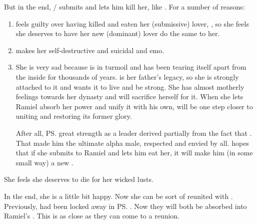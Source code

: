 But in the end, \Shiaraid/\Belzir{} submits and lets him kill her, like . 
For a number of reasons:
\begin{enumerate}
  \item 
    \Shiaraid{} feels guilty over having killed and eaten her (submissive) lover, \Eryal, so she feels she deserves to have her new (dominant) lover do the same to her. 
  \item 
    \NexagglachelsCurse{} makes her self-destructive and suicidal and emo. 
  \item 
    She is very sad because \Mystraacht{} is in turmoil and has been tearing itself apart from the inside for thousands of years. 
    \Mystraacht{} is her father's legacy, so she is strongly attached to it and wants it to live and be strong. 
    She has almost motherly feelings towards her dynasty and will sacrifice herself for it.
    When she lets Ramiel absorb her power and unify it with his own, \Mystraacht{} will be one step closer to uniting and restoring its former glory. 
    
    After all, \ps{\Zachirah} great strength as a leader derived partially from the fact that . 
    That made him the ultimate alpha male, respected and envied by all. 
    \Shiaraid{} hopes that if she submits to Ramiel and lets him eat her, it will make him (in some small way) a new \Zachirah. 
\end{enumerate}

She feels she deserves to die for her wicked \sathariah{} lusts.


In the end, she is a little bit happy. 
Now she can be sort of reunited with . 
Previously, \Eryal{} had been locked away in \ps{\Shiaraid} \carcer. 
Now they will both be absorbed into Ramiel's \carcer. 
This is as close as they can come to a reunion. 

